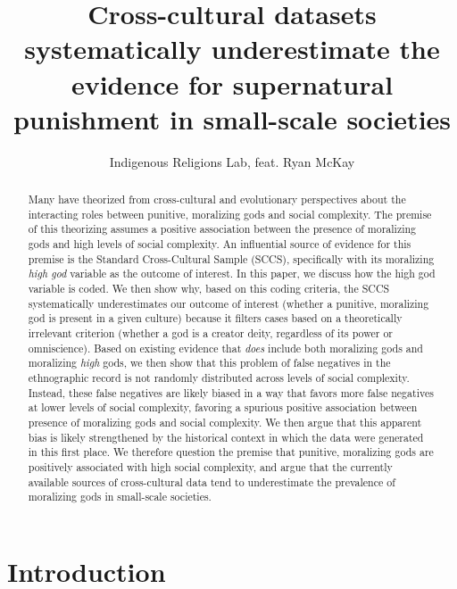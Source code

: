 \documentclass[
]{article}
\title{\textbf{Cross-cultural datasets systematically underestimate the evidence for supernatural punishment in small-scale societies}}
\author{Indigenous Religions Lab, feat. Ryan McKay}
\date{}
\begin{document}
\maketitle
\begin{abstract}
Many have theorized from cross-cultural and evolutionary perspectives about the interacting roles between punitive, moralizing gods and social complexity. The premise of this theorizing assumes a positive association between the presence of moralizing gods and high levels of social complexity. An influential source of evidence for this premise is the Standard Cross-Cultural Sample (SCCS), specifically with its moralizing \emph{high god} variable as the outcome of interest. In this paper, we discuss how the high god variable is coded. We then show why, based on this coding criteria, the SCCS systematically underestimates our outcome of interest (whether a punitive, moralizing god is present in a given culture) because it filters cases based on a theoretically irrelevant criterion (whether a god is a creator deity, regardless of its power or omniscience). Based on existing evidence that \emph{does} include both moralizing gods and moralizing \emph{high} gods, we then show that this problem of false negatives in the ethnographic record is not randomly distributed across levels of social complexity. Instead, these false negatives are likely biased in a way that favors more false negatives at lower levels of social complexity, favoring a spurious positive association between presence of moralizing gods and social complexity. We then argue that this apparent bias is likely strengthened by the historical context in which the data were generated in this first place. We therefore question the premise that punitive, moralizing gods are positively associated with high social complexity, and argue that the currently available sources of cross-cultural data tend to underestimate the prevalence of moralizing gods in small-scale societies.
\end{abstract}

\section{Introduction}
\end{document}
